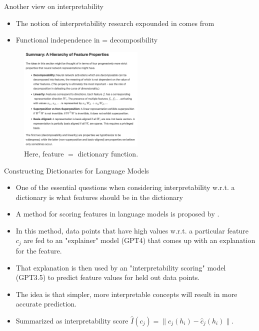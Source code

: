 \begin{frame}[fragile]{Another view on interpretability}
\begin{itemize}
    \item The notion of interpretability research expounded in \citet{Cunningham2023-mu} comes from \citet{Elhage-ob}
    \item Functional independence in \citet{Koelle2024-no} = decomposibility
\end{itemize}
\begin{figure}
    \centering
    \includegraphics[width=6cm]{img/anthropicinterpretability.png}
    \caption*{Here, feature $=$ dictionary function.}
    \label{fig:enter-label}
\end{figure}
\end{frame}

\begin{frame}[fragile]{Constructing Dictionaries for Language Models}

\begin{itemize}
    \item One of the essential questions when considering interpretability w.r.t. a dictionary is what features should be in the dictionary
    \item A method for scoring features in language models is proposed by \citet{Bills-ec}.
    \item In this method, data points that have high values w.r.t. a particular feature $c_j$ are fed to an "explainer" model (GPT4)  that comes up with an explanation for the feature.
    \item That explanation is then used by an "interpretability scoring" model (GPT3.5) to predict feature values for held out data points.
    \item The idea is that simpler, more interpretable concepts will result in more accurate prediction.
    \item Summarized as interpretability score $\hat I (c_j) = \|c_j (h_i) - \hat c_j(h_i)\|$.
\end{itemize}

\vspace{1em}
\end{frame}




